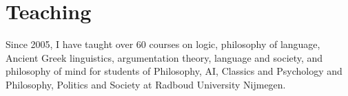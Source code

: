 \documentclass[a4paper,11pt]{article}
\begin{document}
\section*{Teaching}

Since 2005, I have taught over 60 courses on logic, philosophy of language, Ancient Greek linguistics, argumentation theory, language and society, and philosophy of mind for students of Philosophy, AI, Classics and Psychology and Philosophy, Politics and Society at Radboud University Nijmegen.

\end{document}
